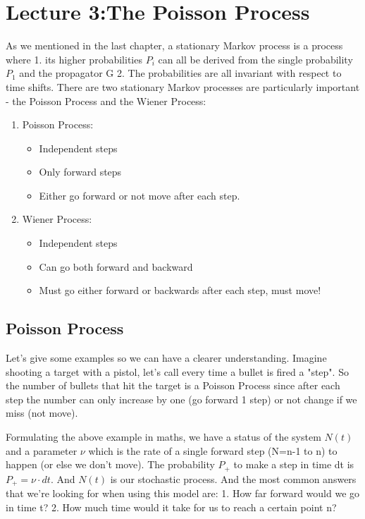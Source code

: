 \documentclass{report}
\begin{document}
%
%
\chapter{Lecture 3:The Poisson Process}
As we mentioned in the last chapter, a stationary Markov process is a process where 1. its higher probabilities $P_i$ can all be derived from the single probability $P_1$ and the propagator G 2. The probabilities are all invariant with respect to time shifts. There are two stationary Markov processes are particularly important - the Poisson Process and the Wiener Process:
\begin{enumerate}
    \item Poisson Process:
          \begin{itemize}
              \item Independent steps
              \item Only forward steps
              \item Either go forward or not move after each step.
          \end{itemize}
    \item Wiener Process:
          \begin{itemize}
              \item Independent steps
              \item Can go both forward and backward
              \item Must go either forward or backwards after each step, must move!
          \end{itemize}
\end{enumerate}
\section{Poisson Process}
Let's give some examples so we can have a clearer understanding. Imagine shooting a target with a pistol, let's call every time a bullet is fired a "step". So the number of bullets that hit the target is a Poisson Process since after each step the number can only increase by one (go forward 1 step) or not change if we miss (not move).

Formulating the above example in maths, we have a status of the system $N(t)$ and a parameter $\nu$ which is the rate of a single forward step (N=n-1 to n) to happen (or else we don't move). The probability $P_+$ to make a step in time dt is $P_+ = \nu \cdot dt$. And $N(t)$ is our stochastic process. And the most common answers that we're looking for when using this model are: 1. How far forward would we go in time t? 2. How much time would it take for us to reach a certain point n?
\end{document}
